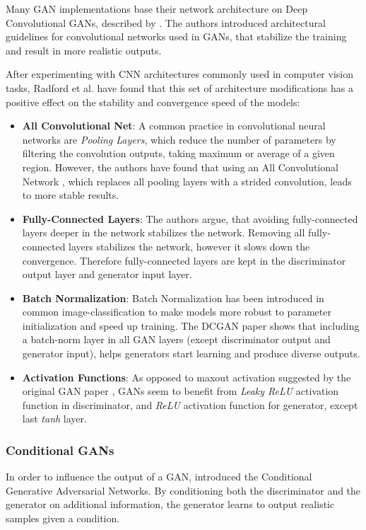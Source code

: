 \documentclass{article}
\begin{document}
Many GAN implementations base their network architecture on Deep Convolutional GANs, described by \cite{radford_unsupervised_2015}. The authors introduced architectural guidelines for convolutional networks used in GANs, that stabilize the training and result in more realistic outputs.

After experimenting with CNN architectures commonly used in computer vision tasks, Radford et al. have found that this set of architecture modifications has a positive effect on the stability and convergence speed of the models:
\begin{itemize}
\item \textbf{All Convolutional Net}: A common practice in convolutional neural networks are \textit{Pooling Layers}, which reduce the number of parameters by filtering the convolution outputs, taking maximum or average of a given region. However, the authors have found that using an All Convolutional Network \cite{springenberg_striving_2014}, which replaces all pooling layers with a strided convolution, leads to more stable results.
\item \textbf{Fully-Connected Layers}: The authors argue, that avoiding fully-connected layers deeper in the network stabilizes the network. Removing all fully-connected layers stabilizes the network, however it slows down the convergence. Therefore fully-connected layers are kept in the discriminator output layer and generator input layer. 
\item \textbf{Batch Normalization}: Batch Normalization \cite{ioffe_batch_2015} has been introduced in common image-classification to make models more robust to parameter initialization and speed up training. The DCGAN paper shows that including a batch-norm layer in all GAN layers (except discriminator output and generator input), helps generators start learning and produce diverse outputs.
\item \textbf{Activation Functions}: As opposed to maxout activation suggested by the original GAN paper \cite{goodfellow_generative_2014}, GANs seem to benefit from \textit{Leaky ReLU} activation function in discriminator, and \textit{ReLU} activation function for generator, except last \textit{tanh} layer. 
\end{itemize}



\subsubsection{Conditional GANs} \label{sec:cond_gan}
In order to influence the output of a GAN, \cite{mirza_conditional_2014} introduced the Conditional Generative Adversarial Networks. By conditioning both the discriminator and the generator on additional information, the generator learns to output realistic samples given a condition. 
\end{document}
